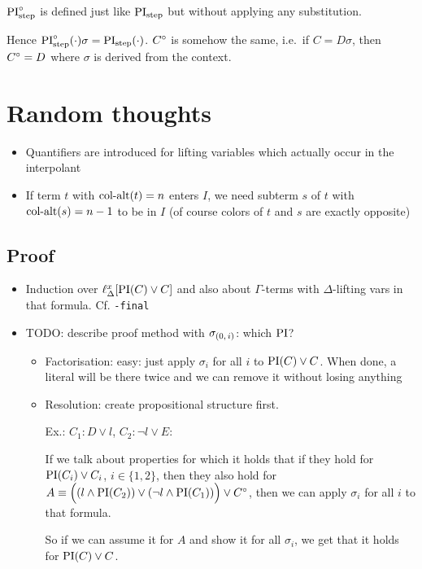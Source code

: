 \documentclass[,%
	draft=false,%
	numbers=noendperiod
	12pt,
	a4paper,
	oneside,%
	openany,
]{memoir}
\begin{document}
\begin{defi}
	$\operatorname{PI}^\circ_{\mathrm{step}}$ is defined just like $\operatorname{PI}_{\mathrm{step}}$ but without applying any substitution.
\end{defi}
Hence $\operatorname{PI}^\circ_{\mathrm{step}}(\cdot) \sigma = \operatorname{PI}_{\mathrm{step}}(\cdot)$.
$C^\circ$ is somehow the same, i.e.\ if $C = D\sigma$, then $C^\circ = D$ where $\sigma$ is derived from the context.

\section{ Random thoughts }

\begin{itemize}
	\item Quantifiers are introduced for lifting variables which actually occur in the interpolant
	\item If term $t$ with $\operatorname{col-alt}(t) = n$ enters $I$, we need subterm $s$ of $t$ with $\operatorname{col-alt}(s) = n-1$ to be in $I$ (of course colors of $t$ and $s$ are exactly opposite)
\end{itemize}


\subsection{ Proof}
\begin{itemize}
	\item Induction over $\ell_{\Delta}^{x}[\operatorname{PI}(C) \lor C]$ and also about $\Gamma$-terms with $\Delta$-lifting vars in that formula. Cf. \texttt{-final}
	\item TODO: describe proof method with $\sigma_{(0,\,i)}$: which $\operatorname{PI}$? 
		\begin{itemize}
			\item Factorisation:
				easy: just apply $\sigma_i$ for all $i$ to $\operatorname{PI}(C) \lor C$. 
				When done, a literal will be there twice and we can remove it without losing anything
			\item Resolution:
				create propositional structure first.

				Ex.: $C_1 : D \lor l$, $ C_2: \lnot l \lor E$:

				If we talk about properties for which it holds that if they hold for $\operatorname{PI}(C_i) \lor C_i$, $i\in\{1,2\}$, then they also hold for $ A \equiv \Big((l \land \operatorname{PI}(C_2)) \lor (\lnot l \land \operatorname{PI}(C_1))\Big) \lor C^\circ$, then we can apply $\sigma_i$ for all $i$ to that formula.

				So if we can assume it for $A$ and show it for all $\sigma_i$, we get that it holds for $\operatorname{PI}(C) \lor C$.

		\end{itemize}
\end{itemize}
\end{document}
